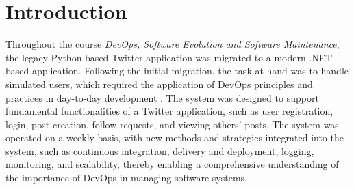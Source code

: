 \chapter{Introduction}

Throughout the course \textit{DevOps, Software Evolution and Software Maintenance}, the legacy Python-based Twitter application was migrated to a modern .NET-based application. Following the initial migration, the task at hand was to handle simulated users, which required the application of DevOps principles and practices in day-to-day development \cite{McCauley}. The system was designed to support fundamental functionalities of a Twitter application, such as user registration, login, post creation, follow requests, and viewing others' posts. The system was operated on a weekly basis, with new methods and strategies integrated into the system, such as continuous integration, delivery and deployment, logging, monitoring, and scalability, thereby enabling a comprehensive understanding of the importance of DevOps in managing software systems.
